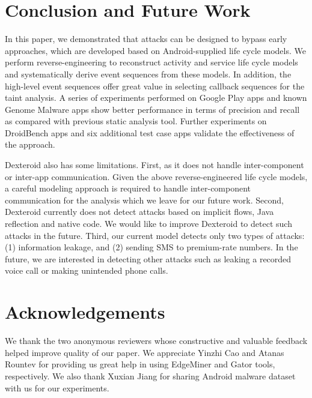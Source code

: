 \documentclass[10pt]{elsarticle}
\begin{document}
 \section{Conclusion and Future Work}


In this paper, we demonstrated that attacks can be designed to bypass early approaches, which are developed based on Android-supplied life cycle models. We perform reverse-engineering to reconstruct activity and service life cycle models and systematically derive event sequences from these models. In addition, the high-level event sequences offer great value in selecting callback sequences for the taint analysis. A series of experiments performed on Google Play apps and known Genome Malware apps show better performance in terms of precision and recall as compared with previous static analysis tool. Further experiments on DroidBench apps and six additional test case apps validate the effectiveness of the approach.

Dexteroid also has some limitations. First, as it does not handle inter-component or inter-app communication. Given the above reverse-engineered life cycle models, a careful modeling approach is required to handle inter-component communication for the analysis which we leave for our future work. Second, Dexteroid currently does not detect attacks based on implicit flows, Java reflection and native code. We would like to improve Dexteroid to detect such attacks in the future. Third, our current model detects only two types of attacks: (1) information leakage, and (2) sending SMS to premium-rate numbers. In the future, we are interested in detecting other attacks such as leaking a recorded voice call or making unintended phone calls. 

 \section*{Acknowledgements}

We thank the two anonymous reviewers whose constructive and valuable feedback helped improve quality of our paper. We appreciate Yinzhi Cao and Atanas Rountev for providing us great help in using EdgeMiner and Gator tools, respectively. We also thank Xuxian Jiang for sharing Android malware dataset with us for our experiments.

\renewcommand{\thesection}{}
\makeatletter
\def\@seccntformat#1{\csname #1ignore\expandafter\endcsname\csname the#1\endcsname\quad}
\let\sectionignore\@gobbletwo
\let\latex@numberline\numberline
\def\numberline#1{\if\relax#1\relax\else\latex@numberline{#1}\fi}
\makeatother



   

  
\end{document}
